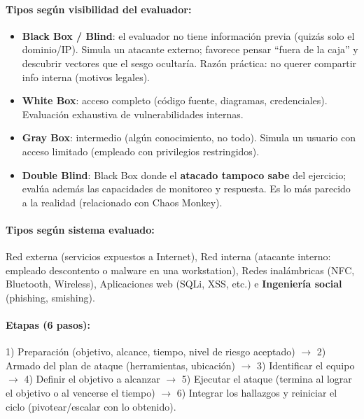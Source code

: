 \documentclass[../main.tex]{subfiles}
\begin{document}
\paragraph{Tipos según visibilidad del evaluador:}
\begin{itemize}
  \item \textbf{Black Box / Blind}: el evaluador no tiene información previa
    (quizás solo el dominio/IP). Simula un atacante externo; favorece pensar
    ``fuera de la caja'' y descubrir vectores que el sesgo ocultaría. Razón
    práctica: no querer compartir info interna (motivos legales).
  \item \textbf{White Box}: acceso completo (código fuente, diagramas,
    credenciales). Evaluación exhaustiva de vulnerabilidades internas.
  \item \textbf{Gray Box}: intermedio (algún conocimiento, no todo). Simula un
    usuario con acceso limitado (empleado con privilegios restringidos).
  \item \textbf{Double Blind}: Black Box donde el \textbf{atacado tampoco sabe}
    del ejercicio; evalúa además las capacidades de monitoreo y respuesta. Es lo
    más parecido a la realidad (relacionado con Chaos Monkey).
\end{itemize}

\paragraph{Tipos según sistema evaluado:} Red externa (servicios expuestos a
Internet), Red interna (atacante interno: empleado descontento o malware en una
workstation), Redes inalámbricas (NFC, Bluetooth, Wireless), Aplicaciones web
(SQLi, XSS, etc.) e \textbf{Ingeniería social} (phishing, smishing).

\paragraph{Etapas (6 pasos):} 1) Preparación (objetivo, alcance, tiempo, nivel
de riesgo aceptado) $\to$ 2) Armado del plan de ataque (herramientas, ubicación)
$\to$ 3) Identificar el equipo $\to$ 4) Definir el objetivo a alcanzar $\to$
5) Ejecutar el ataque (termina al lograr el objetivo o al vencerse el tiempo)
$\to$ 6) Integrar los hallazgos y reiniciar el ciclo (pivotear/escalar con lo
obtenido).
\end{document}

